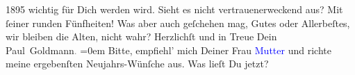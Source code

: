                  1895 wichtig für Dich werden wird. Sieht es nicht vertrauenerweckend
               aus? Mit ſeiner runden Fünfheiten!\pend
           \pstart
           Was aber auch geſchehen mag, Gutes oder Allerbeſtes, wir bleiben die Alten, nicht
               wahr?\pend
           \pstart
           Herzlichſt und in Treue Dein{\\[\baselineskip]}\spacefill\mbox{Paul Goldmann\textcolor{gray}{.}}\pend
           \leftskip=0em{}\pstart
           \noindent{}{\pb}Bitte, empfiehl’ mich Deiner Frau \textcolor{blue}{Mutter}{} und richte \label{T_mets_Goldmann_94-partII-22v}\label{T_mets_Goldmann_94-partII-22h} meine ergebenſten Neujahrs-Wünſche aus.\pend
           \pstart
           Was lieſt Du jetzt?\pend
           \endnumbering{}  
      